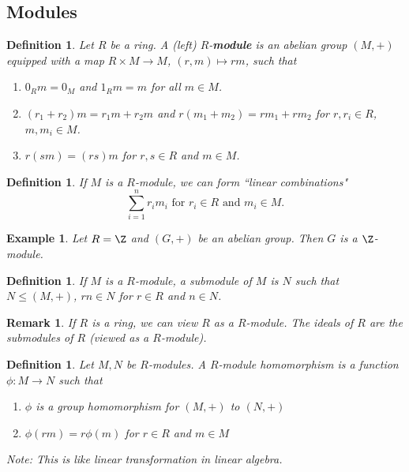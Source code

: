 \documentclass[a4paper,12pt]{article}
\newtheorem{defn}[thm]{Definition}
\newtheorem{eg}[thm]{Example}
\newtheorem{rmk}[thm]{Remark}
\begin{document}
\subsection{Modules}
\begin{defn}
    Let $R$ be a ring. A (left) $R$-\textbf{module} is an abelian group $(M,+)$ equipped with a map $R\times M\to M$, $(r,m)\mapsto rm$, such that 
    \begin{enumerate}
        \item $0_R m=0_M$ and $1_R m=m$ for all $m\in M$.
        \item $(r_1+r_2)m=r_1 m+r_2 m$ and $r(m_1+m_2)=r m_1+r m_2$ for $r,r_i\in R$, $m,m_i\in M$.
        \item $r(sm)=(rs)m$ for $r,s\in R$ and $m\in M$.
    \end{enumerate}
\end{defn}
\begin{defn}
    If $M$ is a $R$-module, we can form ``linear combinations" \[
    \sum_{i=1}^n r_i m_i \text{ for $r_i\in R$ and $m_i\in M$}
    .\] 
\end{defn}
\begin{eg}
    Let $R=\Z$ and $(G,+)$ be an abelian group. Then $G$ is a $\Z$-module.
\end{eg}
\begin{defn}
    If $M$ is a $R$-module, a submodule of $M$ is $N$ such that $N\leq (M,+)$, $rn\in N$ for $r\in R$ and $n\in N$. 
\end{defn}
\begin{rmk}
    If $R$ is a ring, we can view $R$ as a $R$-module. The ideals of $R$ are the submodules of $R$ (viewed as a $R$-module). 
\end{rmk}
\begin{defn}
    Let $M,N$ be $R$-modules. A $R$-module homomorphism is a function $\phi:M\to N$ such that \begin{enumerate}
        \item $\phi$ is a group homomorphism for $(M,+)$ to $(N,+)$
        \item $\phi(rm)=r\phi(m)$ for $r\in R$ and $m\in M$
    \end{enumerate}
    Note: This is like linear transformation in linear algebra. 
\end{defn}
\newpage
\end{document}
